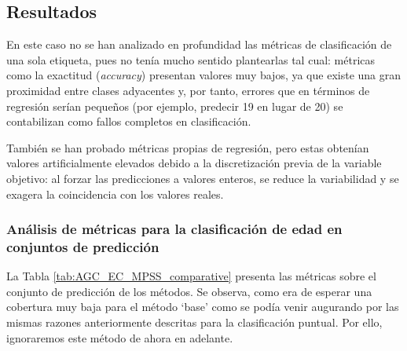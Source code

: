 \subsection{Resultados}

En este caso no se han analizado en profundidad las métricas de clasificación de una sola etiqueta, pues no tenía mucho sentido plantearlas tal cual: métricas como la exactitud (\textit{accuracy}) presentan valores muy bajos, ya que existe una gran proximidad entre clases adyacentes y, por tanto, errores que en términos de regresión serían pequeños (por ejemplo, predecir 19 en lugar de 20) se contabilizan como fallos completos en clasificación.

También se han probado métricas propias de regresión, pero estas obtenían valores artificialmente elevados debido a la discretización previa de la variable objetivo: al forzar las predicciones a valores enteros, se reduce la variabilidad y se exagera la coincidencia con los valores reales.


\subsubsection{Análisis de métricas para la clasificación de edad en conjuntos de predicción}

La Tabla \ref{tab:AGC_EC_MPSS_comparative} presenta las métricas sobre el conjunto de predicción de los métodos. Se observa, como era de esperar una cobertura muy baja para el método `base' como se podía venir augurando por las mismas razones anteriormente descritas para la clasificación puntual. Por ello, ignoraremos este método de ahora en adelante.

